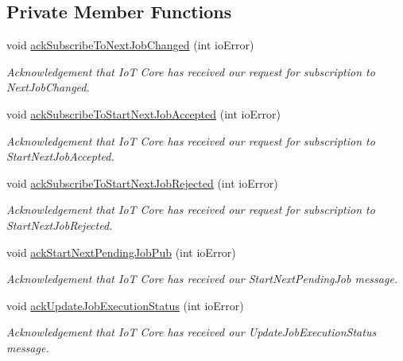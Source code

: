 \subsection*{Private Member Functions}
\begin{DoxyCompactItemize}
\item 
void \hyperlink{class_aws_1_1_iot_1_1_device_client_1_1_jobs_1_1_jobs_feature_a4031ad851a1bb42ced1392fb32090e46}{ack\+Subscribe\+To\+Next\+Job\+Changed} (int io\+Error)
\begin{DoxyCompactList}\small\item\em Acknowledgement that IoT Core has received our request for subscription to Next\+Job\+Changed. \end{DoxyCompactList}\item 
void \hyperlink{class_aws_1_1_iot_1_1_device_client_1_1_jobs_1_1_jobs_feature_a61eaca0e8195d1805b1ea94b39d04474}{ack\+Subscribe\+To\+Start\+Next\+Job\+Accepted} (int io\+Error)
\begin{DoxyCompactList}\small\item\em Acknowledgement that IoT Core has received our request for subscription to Start\+Next\+Job\+Accepted. \end{DoxyCompactList}\item 
void \hyperlink{class_aws_1_1_iot_1_1_device_client_1_1_jobs_1_1_jobs_feature_ae34fa1e7a48d09d81b7007c991a1719f}{ack\+Subscribe\+To\+Start\+Next\+Job\+Rejected} (int io\+Error)
\begin{DoxyCompactList}\small\item\em Acknowledgement that IoT Core has received our request for subscription to Start\+Next\+Job\+Rejected. \end{DoxyCompactList}\item 
void \hyperlink{class_aws_1_1_iot_1_1_device_client_1_1_jobs_1_1_jobs_feature_a63306a1777aae7bb64a3e80bc1285d72}{ack\+Start\+Next\+Pending\+Job\+Pub} (int io\+Error)
\begin{DoxyCompactList}\small\item\em Acknowledgement that IoT Core has received our Start\+Next\+Pending\+Job message. \end{DoxyCompactList}\item 
void \hyperlink{class_aws_1_1_iot_1_1_device_client_1_1_jobs_1_1_jobs_feature_abfca3cadf2210cea1b6fcc82bbb21725}{ack\+Update\+Job\+Execution\+Status} (int io\+Error)
\begin{DoxyCompactList}\small\item\em Acknowledgement that IoT Core has received our Update\+Job\+Execution\+Status message. \end{DoxyCompactList}\item 

\end{DoxyCompactItemize}
